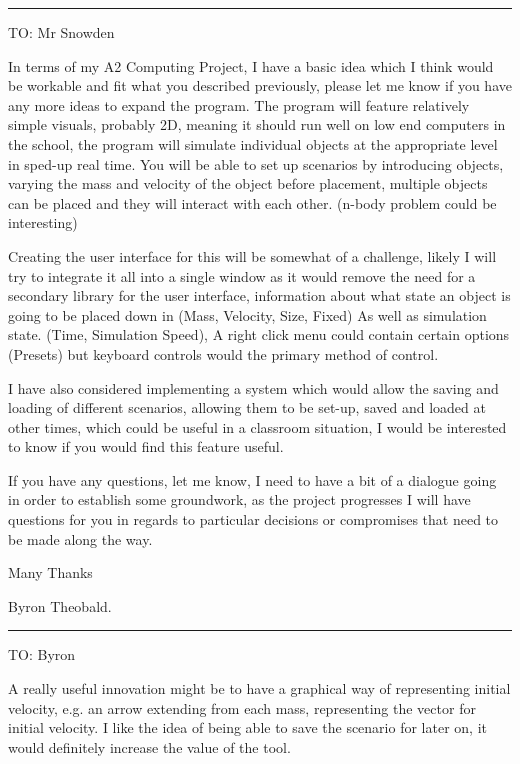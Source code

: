 {
\parskip=10pt
\vspace{8pt}
\hrule

TO: Mr Snowden

In terms of my A2 Computing Project, I have a basic idea which I think would be workable and fit what you described previously, please let me know if you have any more ideas to expand the program.
The program will feature relatively simple visuals, probably 2D, meaning it should run well on low end computers in the school, the program will simulate individual objects at the appropriate level in sped-up real time.
You will be able to set up scenarios by introducing objects, varying the mass and velocity of the object before placement, multiple objects can be placed and they will interact with each other. (n-body problem could be interesting)

Creating the user interface for this will be somewhat of a challenge, likely I will try to integrate it all into a single window as it would remove the need for a secondary library for the user interface, information about what state an object is going to be placed down in (Mass, Velocity, Size, Fixed) As well as simulation state. (Time, Simulation Speed), A right click menu could contain certain options (Presets) but keyboard controls would the primary method of control.

I have also considered implementing a system which would allow the saving and loading of different scenarios, allowing them to be set-up, saved and loaded at other times, which could be useful in a classroom situation, I would be interested to know if you would find this feature useful.

If you have any questions, let me know, I need to have a bit of a dialogue going in order to establish some groundwork, as the project progresses I will have questions for you in regards to particular decisions or compromises that need to be made along the way.

Many Thanks

Byron Theobald.

\vspace{8pt}
\hrule

TO: Byron

A really useful innovation might be to have a graphical way of representing initial velocity, e.g. an arrow extending from each mass, representing the vector for initial velocity.
I like the idea of being able to save the scenario for later on, it would definitely increase the value of the tool.

}
